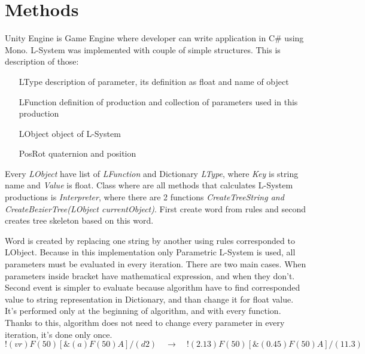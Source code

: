 \documentclass[b5paper,twoside,11pt]{article}
\begin{document}
\section{Methods}
Unity Engine is Game Engine where developer can write application in C\# using Mono. L-System was implemented with couple of simple structures. This is description of those:
\begin{itemize}[labelindent=5.5em,labelsep=1cm,leftmargin=*]
\item [LType] description of parameter, its definition as float and name of object
\item [LFunction] definition of production and collection of parameters used in this production
\item [LObject] object of L-System
\item [PosRot] quaternion and position
\end{itemize}
Every \textit{LObject} have list of \textit{LFunction} and Dictionary \textit{LType}, where \textit{Key} is string name and \textit{Value} is float.
Class where are all methods that calculates L-System productions is \textit{Interpreter}, where there are 2  functions \textit{CreateTreeString and} \textit{CreateBezierTree(LObject currentObject)}. First create word from rules and second creates tree skeleton based on this word. \par
Word is created by replacing one string by another using rules corresponded to LObject. Because in this implementation only Parametric L-System is used, all parameters must be evaluated in every iteration. There are two main cases. When parameters inside bracket have mathematical expression, and when they don't. Second event is simpler to evaluate because algorithm have to find corresponded value to string representation in Dictionary, and than change it for float value. It's performed only at the beginning of algorithm, and with every function. Thanks to this, algorithm does not need to change every parameter in every iteration, it's done only once.
\begin{equation} 
!(vr)F(50)[ \&(a)F(50)A]/(d2) \quad\longrightarrow\quad !(2.13)F(50)[ \&(0.45)F(50)A]/(11.3)
 \end{equation}
\end{document}
